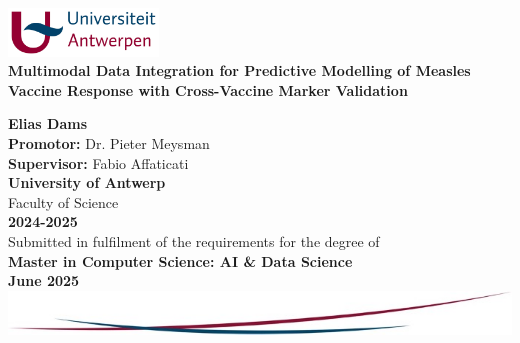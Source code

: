 \documentclass[12pt,a4paper]{report}
\begin{document}
\begin{titlepage}
    \centering

    \includegraphics[width=0.3\textwidth]{images/uantwerpen_logo.jpg}\\[1cm]

    {\Huge \textbf{Multimodal Data Integration for Predictive Modelling of Measles Vaccine Response with Cross-Vaccine Marker Validation}} \\
    \vfill

    {\Large \textbf{Elias Dams}}\\[1cm]

    \textbf{Promotor:} Dr. Pieter Meysman\\
    \textbf{Supervisor:} Fabio Affaticati\\[1.5cm]

    {\Large \textbf{University of Antwerp}}\\
    {\large Faculty of Science}\\[0.5cm]

    \textbf{2024-2025}\\[1.5cm]

    Submitted in fulfilment of the requirements for the degree of\\
    \textbf{Master in Computer Science: AI \& Data Science}\\[1cm]

    \textbf{June 2025}\\[2cm]

    \vfill
    \includegraphics[width=1.0\textwidth]{images/bottom_design.jpg}

\end{titlepage}

\tableofcontents
\newpage

{}
\listoffigures

{}
\listoftables

{}
\printglossary[type=\acronymtype, title=List of Acronyms, toctitle=List of Acronyms, style=long]
\end{document}
